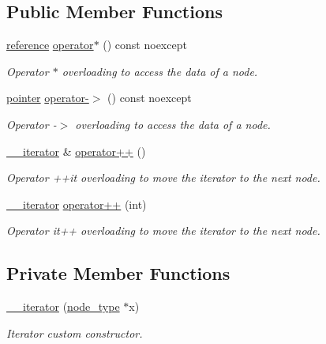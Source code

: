 \subsection*{Public Member Functions}
\begin{DoxyCompactItemize}
\item 
\hyperlink{classbst_1_1____iterator_a3189983e4edb73a8ce449b290ceb97d1}{reference} \hyperlink{classbst_1_1____iterator_aa4e7abcc2bb06e8778e3912803b96433}{operator$\ast$} () const noexcept
\begin{DoxyCompactList}\small\item\em Operator $\ast$ overloading to access the data of a node. \end{DoxyCompactList}\item 
\hyperlink{classbst_1_1____iterator_adb4d1d8f8048f7036ff5ac383ea9c649}{pointer} \hyperlink{classbst_1_1____iterator_a2a8b7a79b927e8e02b3247188c867e6d}{operator-\/$>$} () const noexcept
\begin{DoxyCompactList}\small\item\em Operator -\/$>$ overloading to access the data of a node. \end{DoxyCompactList}\item 
\hyperlink{classbst_1_1____iterator}{\+\_\+\+\_\+iterator} \& \hyperlink{classbst_1_1____iterator_a0551167f26a1769faa27afd7018eeb03}{operator++} ()
\begin{DoxyCompactList}\small\item\em Operator ++it overloading to move the iterator to the next node. \end{DoxyCompactList}\item 
\hyperlink{classbst_1_1____iterator}{\+\_\+\+\_\+iterator} \hyperlink{classbst_1_1____iterator_a0a43380fa33e82342236ef747a5e72e2}{operator++} (int)
\begin{DoxyCompactList}\small\item\em Operator it++ overloading to move the iterator to the next node. \end{DoxyCompactList}\end{DoxyCompactItemize}
\subsection*{Private Member Functions}
\begin{DoxyCompactItemize}
\item 
\hyperlink{classbst_1_1____iterator_a0fabfd3d99d7c15da13123229a4cbede}{\+\_\+\+\_\+iterator} (\hyperlink{classbst_a062eb2a1ac54802dbc4f0f74ae2afd01}{node\+\_\+type} $\ast$x)
\begin{DoxyCompactList}\small\item\em Iterator custom constructor. \end{DoxyCompactList}\end{DoxyCompactItemize}
